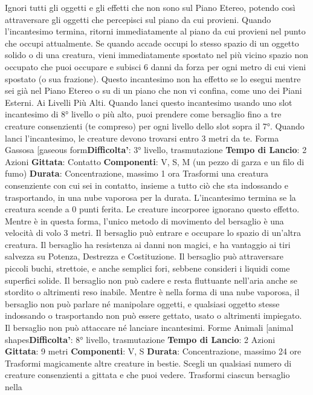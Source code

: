 \begin{multicols}{2}
Ignori tutti gli oggetti e gli effetti che non sono sul Piano
Etereo, potendo così attraversare gli oggetti che
percepisci sul piano da cui provieni.
Quando l’incantesimo termina, ritorni immediatamente
al piano da cui provieni nel punto che occupi
attualmente. Se quando accade occupi lo stesso spazio
di un oggetto solido o di una creatura, vieni
immediatamente spostato nel più vicino spazio non
occupato che puoi occupare e subisci 6 danni da forza
per ogni metro di cui vieni spostato (o sua frazione).
Questo incantesimo non ha effetto se lo esegui mentre
sei già nel Piano Etereo o su di un piano che non vi
confina, come uno dei Piani Esterni.
Ai Livelli Più Alti. Quando lanci questo incantesimo
usando uno slot incantesimo di 8° livello o più alto, puoi
prendere come bersaglio fino a tre creature
consenzienti (te compreso) per ogni livello dello slot
sopra il 7°. Quando lanci l’incantesimo, le creature
devono trovarsi entro 3 metri da te.
Forma Gassosa
[gaseous form\textbf{Difficolta'}:
3° livello, trasmutazione
\textbf{Tempo di Lancio}: 2 Azioni
\textbf{Gittata}: Contatto
\textbf{Componenti}: V, S, M (un pezzo di garza e un filo di
fumo)
\textbf{Durata}: Concentrazione, massimo 1 ora
Trasformi una creatura consenziente con cui sei in
contatto, insieme a tutto ciò che sta indossando e
trasportando, in una nube vaporosa per la durata.
L’incantesimo termina se la creatura scende a 0 punti
ferita. Le creature incorporee ignorano questo effetto.
Mentre è in questa forma, l’unico metodo di movimento
del bersaglio è una velocità di volo 3 metri. Il bersaglio
può entrare e occupare lo spazio di un’altra creatura. Il
bersaglio ha resistenza ai danni non magici, e ha
vantaggio ai tiri salvezza su Potenza, Destrezza e
Costituzione. Il bersaglio può attraversare piccoli buchi,
strettoie, e anche semplici fori, sebbene consideri i
liquidi come superfici solide. Il bersaglio non può cadere
e resta fluttuante nell’aria anche se stordito o altrimenti
reso inabile.
Mentre è nella forma di una nube vaporosa, il bersaglio
non può parlare né manipolare oggetti, e qualsiasi
oggetto stesse indossando o trasportando non può
essere gettato, usato o altrimenti impiegato. Il bersaglio
non può attaccare né lanciare incantesimi.
Forme Animali
[animal shapes\textbf{Difficolta'}:
8° livello, trasmutazione
\textbf{Tempo di Lancio}: 2 Azioni
\textbf{Gittata}: 9 metri
\textbf{Componenti}: V, S
\textbf{Durata}: Concentrazione, massimo 24 ore
Trasformi magicamente altre creature in bestie. Scegli
un qualsiasi numero di creature consenzienti a gittata e
che puoi vedere. Trasformi ciascun bersaglio nella

\end{multicols}
